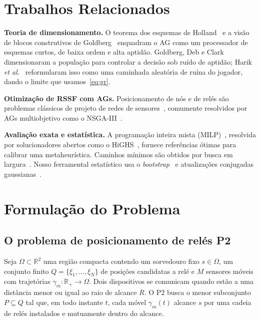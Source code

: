 \documentclass[conference]{IEEEtran}
\newcommand{\Real}{\mathbb{R}}
\begin{document}
\section{Trabalhos Relacionados}
\label{sec:related}
\textbf{Teoria de dimensionamento.} O teorema dos esquemas de
Holland~\cite{holland1975adaptation} e a visão de blocos construtivos de
Goldberg~\cite{goldberg1989ga} enquadram o AG como um processador de esquemas
curtos, de baixa ordem e alta aptidão. Goldberg, Deb e
Clark~\cite{goldberg1992sizing} dimensionaram a população para controlar a decisão
sob ruído de aptidão; Harik \emph{et al.}~\cite{harik1999gambler} reformularam isso
como uma caminhada aleatória de ruína do jogador, dando o limite que
usamos~\eqref{eq:gr}.

\textbf{Otimização de RSSF com AGs.} Posicionamento de nós e de relés são problemas
clássicos de projeto de redes de sensores~\cite{younis2008placement}, comumente
resolvidos por AGs multiobjetivo como o NSGA-III~\cite{deb2014nsga3}.

\textbf{Avaliação exata e estatística.} A programação inteira mista
(MILP)~\cite{wolsey1998integer}, resolvida por solucionadores abertos como o
HiGHS~\cite{huangfu2018highs}, fornece referências ótimas para calibrar uma
metaheurística. Caminhos mínimos são obtidos por busca em
largura~\cite{cormen2009algorithms}. Nosso ferramental estatístico usa o
\emph{bootstrap}~\cite{efron1993bootstrap} e atualizações conjugadas
gaussianas~\cite{gelman2013bayesian}.

\section{Formulação do Problema}
\label{sec:problema}
\subsection{O problema de posicionamento de relés P2}
Seja $\Omega\subset\Real^2$ uma região compacta contendo um sorvedouro fixo
$s\in\Omega$, um conjunto finito $Q=\{\xi_1,\dots,\xi_N\}$ de posições candidatas a
relé e $M$ sensores móveis com trajetórias $\gamma_m:\Real_+\!\to\Omega$. Dois
dispositivos se comunicam quando estão a uma distância menor ou igual ao raio de
alcance $R$. O P2 busca o menor subconjunto $P\subseteq Q$ tal que, em todo
instante $t$, cada móvel $\gamma_m(t)$ alcance $s$ por uma cadeia de relés
instalados e mutuamente dentro do alcance.
\end{document}
